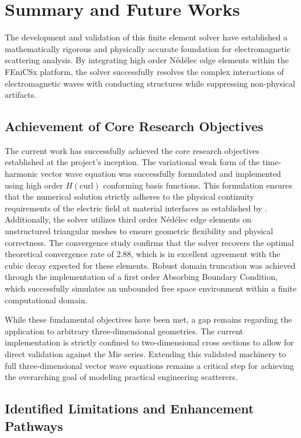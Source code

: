 \documentclass[class=report, crop=false]{standalone}
\begin{document}
\section{Summary and Future Works}

The development and validation of this finite element solver have established a mathematically rigorous and physically accurate foundation for electromagnetic scattering analysis. By integrating high order Nédélec edge elements within the FEniCSx platform, the solver successfully resolves the complex interactions of electromagnetic waves with conducting structures while suppressing non-physical artifacts.

\subsection{Achievement of Core Research Objectives}

The current work has successfully achieved the core research objectives established at the project's inception. The variational weak form of the time-harmonic vector wave equation was successfully formulated and implemented using high order $H(\text{curl})$ conforming basis functions. This formulation ensures that the numerical solution strictly adheres to the physical continuity requirements of the electric field at material interfaces as established by \citet{Nedelec1980}. Additionally, the solver utilizes third order Nédélec edge elements on unstructured triangular meshes to ensure geometric flexibility and physical correctness. The convergence study confirms that the solver recovers the optimal theoretical convergence rate of 2.88, which is in excellent agreement with the cubic decay expected for these elements. Robust domain truncation was achieved through the implementation of a first order Absorbing Boundary Condition, which successfully simulates an unbounded free space environment within a finite computational domain.

While these fundamental objectives have been met, a gap remains regarding the application to arbitrary three-dimensional geometries. The current implementation is strictly confined to two-dimensional cross sections to allow for direct validation against the Mie series. Extending this validated machinery to full three-dimensional vector wave equations remains a critical step for achieving the overarching goal of modeling practical engineering scatterers.

\subsection{Identified Limitations and Enhancement Pathways}
\end{document}
